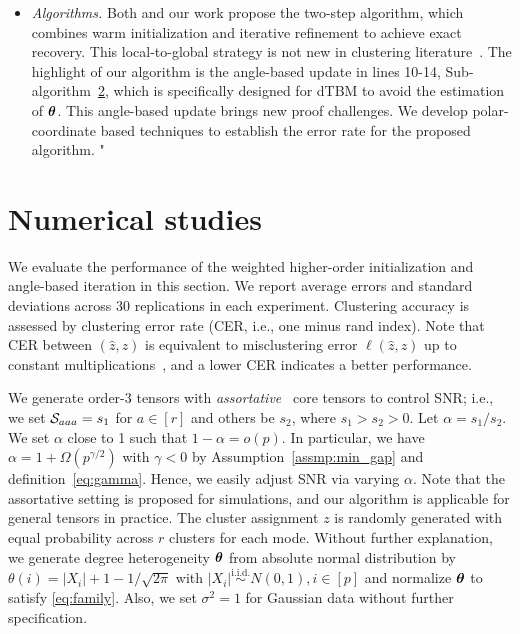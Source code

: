 \documentclass[journal]{IEEEtran}
\theoremstyle{definition}
\theoremstyle{definition}
\begin{document}
\begin{itemize}[wide]
 \item \textit{Algorithms.} Both \cite{han2020exact} and our work propose the two-step algorithm, which combines warm initialization and iterative refinement to achieve exact recovery. This local-to-global strategy is not new in clustering literature~\citep{gao2022iterative, chien2019minimax}. The highlight of our algorithm is the angle-based update in lines 10-14, Sub-algorithm~\hyperref[alg:main]{2}, which is specifically designed for dTBM to avoid the estimation of $\boldsymbol{\theta}$. This angle-based update brings new proof challenges. We develop polar-coordinate based techniques to establish the error rate for the proposed algorithm. "
\end{itemize}

\section{Numerical studies}\label{sec:simulation}

 We evaluate the performance of the weighted higher-order initialization and angle-based iteration in this section. We report average errors and standard deviations across 30 replications in each experiment. Clustering accuracy is assessed by clustering error rate (CER, i.e., one minus rand index). Note that CER between $(\hat z, z)$ is equivalent to misclustering error $\ell(\hat z, z)$ up to constant multiplications~\citep{meilua2012local}, and a lower CER indicates a better performance.

We generate order-3 tensors with \emph{assortative}~\citep{gao2018community} core tensors to control SNR; i.e., we set $\mathcal{S}_{aaa} = s_1$ for $a \in [r]$ and others be $s_2$, where $s_1 > s_2 > 0$. Let $\alpha = s_1/s_2$. We set $\alpha$ close to 1 such that $1-\alpha=o(p)$. In particular, we have $\alpha = 1 + \Omega(p^{\gamma/2})$ with $\gamma<0$ by Assumption~\ref{assmp:min_gap} and definition~\eqref{eq:gamma}. Hence, we easily adjust SNR via varying $\alpha$. Note that the assortative setting is proposed for simulations, and our algorithm is applicable for general tensors in practice. The cluster assignment $z$ is randomly generated with equal probability across  $r$ clusters for each mode. Without further explanation, we generate degree heterogeneity $\boldsymbol{\theta}$ from absolute normal distribution by $\theta(i) = |X_i| + 1 - 1/\sqrt{2\pi}$ with $|X_i| \stackrel{\text{i.i.d.}}\sim N(0,1), i \in [p]$ and normalize $\boldsymbol{\theta}$ to satisfy \eqref{eq:family}. Also, we set $\sigma^2 = 1$ for Gaussian data without further specification. 
\end{document}
